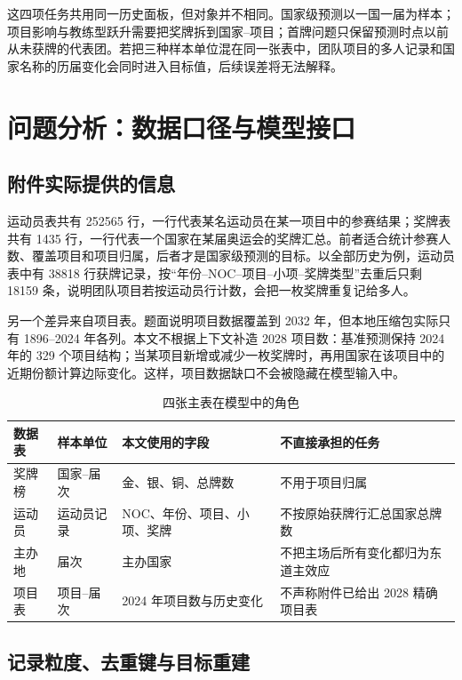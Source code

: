 \documentclass[UTF8,11pt,a4paper]{ctexart}
\begin{document}
这四项任务共用同一历史面板，但对象并不相同。国家级预测以一国一届为样本；项目影响与教练型跃升需要把奖牌拆到国家--项目；首牌问题只保留预测时点以前从未获牌的代表团。若把三种样本单位混在同一张表中，团队项目的多人记录和国家名称的历届变化会同时进入目标值，后续误差将无法解释。

\section{问题分析：数据口径与模型接口}

\subsection{附件实际提供的信息}

运动员表共有 252565 行，一行代表某名运动员在某一项目中的参赛结果；奖牌表共有 1435 行，一行代表一个国家在某届奥运会的奖牌汇总。前者适合统计参赛人数、覆盖项目和项目归属，后者才是国家级预测的目标。以全部历史为例，运动员表中有 38818 行获牌记录，按“年份--NOC--项目--小项--奖牌类型”去重后只剩 18159 条，说明团队项目若按运动员行计数，会把一枚奖牌重复记给多人。

另一个差异来自项目表。题面说明项目数据覆盖到 2032 年，但本地压缩包实际只有 1896--2024 年各列。本文不根据上下文补造 2028 项目数：基准预测保持 2024 年的 329 个项目结构；当某项目新增或减少一枚奖牌时，再用国家在该项目中的近期份额计算边际变化。这样，项目数据缺口不会被隐藏在模型输入中。

\begin{table}[H]
\centering
\caption{四张主表在模型中的角色}
\label{tab:data-role}
\begin{tabularx}{\textwidth}{p{3.2cm}p{2.0cm}X X}
\toprule
数据表 & 样本单位 & 本文使用的字段 & 不直接承担的任务\\
\midrule
奖牌榜 & 国家--届次 & 金、银、铜、总牌数 & 不用于项目归属\\
运动员 & 运动员记录 & NOC、年份、项目、小项、奖牌 & 不按原始获牌行汇总国家总牌数\\
主办地 & 届次 & 主办国家 & 不把主场后所有变化都归为东道主效应\\
项目表 & 项目--届次 & 2024 年项目数与历史变化 & 不声称附件已给出 2028 精确项目表\\
\bottomrule
\end{tabularx}
\end{table}

\subsection{记录粒度、去重键与目标重建}
\end{document}
